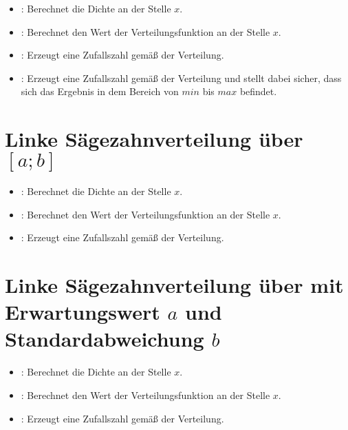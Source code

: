 \begin{itemize}

\item
{}:
Berechnet die Dichte an der Stelle $x$.

\item
{}:
Berechnet den Wert der Verteilungsfunktion an der Stelle $x$.

\item
{}:
Erzeugt eine Zufallszahl gemäß der Verteilung.

\item
{}:
Erzeugt eine Zufallszahl gemäß der Verteilung und stellt dabei sicher, dass sich das Ergebnis in dem Bereich von $min$ bis $max$ befindet.

\end{itemize}



\section{Linke Sägezahnverteilung über \texorpdfstring{$[a;b]$}{[a;b]}}

\begin{itemize}

\item
{}:
Berechnet die Dichte an der Stelle $x$.

\item
{}:
Berechnet den Wert der Verteilungsfunktion an der Stelle $x$.

\item
{}:
Erzeugt eine Zufallszahl gemäß der Verteilung.

\end{itemize}



\section{Linke Sägezahnverteilung über mit Erwartungswert \texorpdfstring{$a$}{a} und Standardabweichung \texorpdfstring{$b$}{b}}

\begin{itemize}

\item
{}:
Berechnet die Dichte an der Stelle $x$.

\item
{}:
Berechnet den Wert der Verteilungsfunktion an der Stelle $x$.

\item
{}:
Erzeugt eine Zufallszahl gemäß der Verteilung.

\end{itemize}



